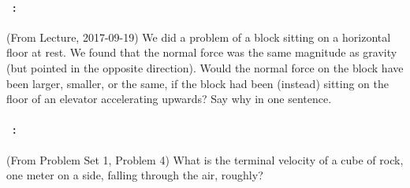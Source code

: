 \documentclass[12pt]{article}
\begin{document}
\vfill

\paragraph{\problemname~\theproblem:}%
(From Lecture, 2017-09-19)
We did a problem of a block sitting on a horizontal floor at rest. We
found that the normal force was the same magnitude as gravity (but
pointed in the opposite direction). Would the normal force on the
block have been larger, smaller, or the same, if the block had been (instead) sitting
on the floor of an elevator accelerating upwards? Say why in one sentence.

\vfill

\paragraph{\problemname~\theproblem:}%
(From Problem Set 1, Problem 4)
What is the terminal velocity of a cube of rock, one meter on a side,
falling through the air, roughly?

\vfill
~
\end{document}
